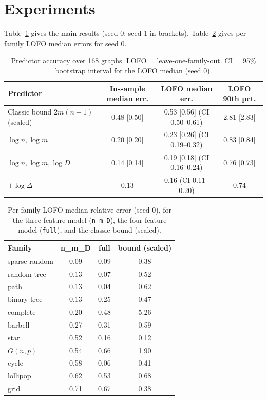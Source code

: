 \documentclass[10pt]{article}
\begin{document}
\section{Experiments}
Table~\ref{tab:main} gives the main results (seed 0; seed 1 in brackets). Table~\ref{tab:fam}
gives per-family LOFO median errors for seed 0.

\begin{table}[h]
\centering
\caption{Predictor accuracy over 168 graphs. LOFO = leave-one-family-out. CI = 95\% bootstrap interval for the LOFO median (seed 0).}
\label{tab:main}
\begin{tabular}{lccc}
\toprule
Predictor & In-sample median err. & LOFO median err. & LOFO 90th pct. \\
\midrule
Classic bound $2m(n-1)$ (scaled) & 0.48 [0.50] & 0.53 [0.56] (CI 0.50--0.61) & 2.81 [2.83] \\
$\log n,\log m$ & 0.20 [0.20] & 0.23 [0.26] (CI 0.19--0.32) & 0.83 [0.84] \\
$\log n,\log m,\log D$ & 0.14 [0.14] & 0.19 [0.18] (CI 0.16--0.24) & 0.76 [0.73] \\
$+\log\Delta$ & 0.13 & 0.16 (CI 0.11--0.20) & 0.74 \\
\bottomrule
\end{tabular}
\end{table}

\begin{table}[h]
\centering
\caption{Per-family LOFO median relative error (seed 0), for the three-feature model (\texttt{n\_m\_D}), the four-feature model (\texttt{full}), and the classic bound (scaled).}
\label{tab:fam}
\begin{tabular}{lccc}
\toprule
Family & n\_m\_D & full & bound (scaled) \\
\midrule
sparse random & 0.09 & 0.09 & 0.38 \\
random tree & 0.13 & 0.07 & 0.52 \\
path & 0.13 & 0.04 & 0.62 \\
binary tree & 0.13 & 0.25 & 0.47 \\
complete & 0.20 & 0.48 & 5.26 \\
barbell & 0.27 & 0.31 & 0.59 \\
star & 0.52 & 0.16 & 0.12 \\
$G(n,p)$ & 0.54 & 0.66 & 1.90 \\
cycle & 0.58 & 0.06 & 0.41 \\
lollipop & 0.62 & 0.53 & 0.68 \\
grid & 0.71 & 0.67 & 0.38 \\
\bottomrule
\end{tabular}
\end{table}
\end{document}
